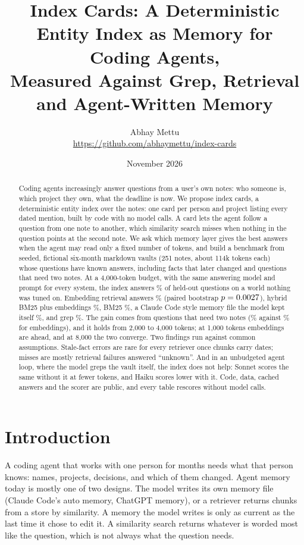 \documentclass[11pt]{article}
\title{Index Cards: A Deterministic Entity Index as Memory for Coding Agents,\\Measured Against Grep, Retrieval and Agent-Written Memory}
\author{Abhay Mettu\\\small\url{https://github.com/abhaymettu/index-cards}}
\date{November 2026}
\begin{document}
\maketitle

\begin{abstract}
Coding agents increasingly answer questions from a user's own notes: who someone is, which project they own, what
the deadline is now. We propose index cards, a deterministic entity index over the notes: one card per person and
project listing every dated mention, built by code with no model calls. A card lets the agent follow a question
from one note to another, which similarity search misses when nothing in the question points at the second note.
We ask which memory layer gives the best answers when the agent may read only a fixed number of tokens, and build a
benchmark from seeded, fictional six-month markdown vaults (251 notes, about 114k tokens each) whose questions have
known answers, including facts that later changed and questions that need two notes. At a 4,000-token budget, with
the same answering model and prompt for every system, the index answers
\MainCardsFourAcc\% of held-out questions on a world nothing was tuned on. Embedding retrieval answers
\MainRagFourAcc\% (paired bootstrap $p=0.0027$), hybrid BM25 plus embeddings \MainHybridFourAcc\%, BM25
\MainBmFourAcc\%, a Claude Code style memory file the model kept itself \MainMemoryFourAcc\%, and grep
\MainGrepFourAcc\%. The gain comes from questions that need two notes (\MainCardsFourMultihop\% against
\MainRagFourMultihop\% for embeddings), and it holds from 2,000 to 4,000 tokens; at 1,000 tokens embeddings are
ahead, and at 8,000 the two converge. Two findings run against common assumptions. Stale-fact errors are rare
for every retriever once chunks carry dates; misses are mostly retrieval failures answered ``unknown''. And in an
unbudgeted agent loop, where the model greps the vault itself, the index does not help: Sonnet scores the same
without it at fewer tokens, and Haiku scores lower with it. Code, data, cached answers and the scorer are public,
and every table rescores without model calls.
\end{abstract}

\section{Introduction}

A coding agent that works with one person for months needs what that person knows: names, projects, decisions, and
which of them changed. Agent memory today is mostly one of two designs. The model writes its own memory file
(Claude Code's auto memory, ChatGPT memory), or a retriever returns chunks from a store by similarity. A memory the
model writes is only as current as the last time it chose to edit it. A similarity search returns whatever is
worded most like the question, which is not always what the question needs.
\end{document}

